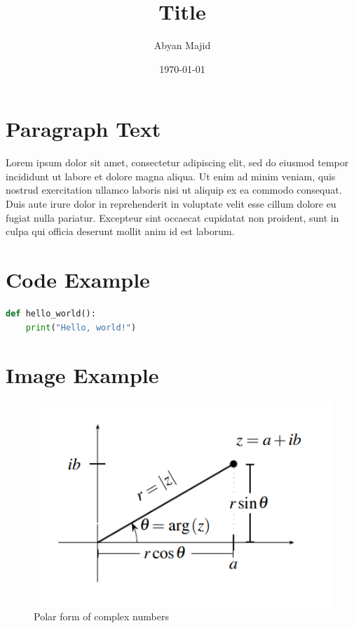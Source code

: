 \documentclass{article}
\begin{document}
\title{Title}
\author{Abyan Majid}
\date{\today}
\maketitle

\section{Paragraph Text}

Lorem ipsum dolor sit amet, consectetur adipiscing 
elit, sed do eiusmod tempor incididunt ut labore et 
dolore magna aliqua. Ut enim ad minim veniam, quis 
nostrud exercitation ullamco laboris nisi ut 
aliquip ex ea commodo consequat. Duis aute irure 
dolor in reprehenderit in voluptate velit esse 
cillum dolore eu fugiat nulla pariatur. Excepteur
sint occaecat cupidatat non proident, sunt in 
culpa qui officia deserunt mollit anim id est laborum.

\section{Code Example}

\begin{lstlisting}[language=Python, caption={Example Code Block}]
def hello_world():
    print("Hello, world!")
\end{lstlisting}

\section{Image Example}

\begin{figure}[H]
    \centering
    \includegraphics{../!assets/MATH1021-003-fig1.png}
    \caption{Polar form of complex numbers}
\end{figure}
\end{document}
